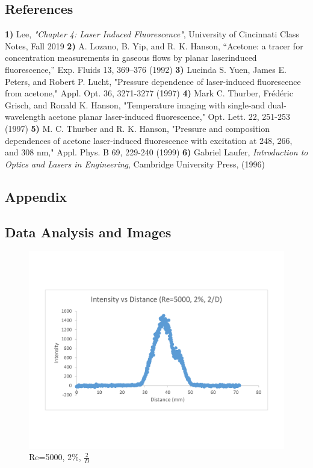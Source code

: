 \documentclass[preview,12pt]{article}
\begin{document}
\newpage
\begin{center}
    \section*{References}
\end{center}
\newline
\textbf{1)} Lee, \textit{"Chapter 4: Laser Induced Fluorescence"}, University of Cincinnati Class Notes, Fall 2019 \newline
\textbf{2)}  A. Lozano, B. Yip, and R. K. Hanson, “Acetone: a tracer for concentration measurements in gaseous flows by planar laserinduced fluorescence,” Exp. Fluids 13, 369–376 (1992) \newline
\textbf{3)}  Lucinda S. Yuen, James E. Peters, and Robert P. Lucht, "Pressure dependence of laser-induced fluorescence from acetone," Appl. Opt. 36, 3271-3277 (1997)\newline
\textbf{4)}  Mark C. Thurber, Frédéric Grisch, and Ronald K. Hanson, "Temperature imaging with single-and dual-wavelength acetone planar laser-induced fluorescence," Opt. Lett. 22, 251-253 (1997) \newline
\textbf{5)} M. C. Thurber and R. K. Hanson, "Pressure and composition dependences of acetone laser-induced fluorescence with excitation at 248, 266, and 308 nm," Appl. Phys. B 69, 229-240 (1999) \newline
\textbf{6)} Gabriel Laufer, \textit{Introduction to Optics and Lasers in Engineering}, Cambridge University Press, (1996) \newline
\newpage
\begin{center}
    \section*{Appendix}
    \subsection*{Data Analysis and Images}
\end{center}
\begin{figure}[h]
    \centering
    \includegraphics[width=0.55\linewidth]{RE-5000-20-cs2D.pdf}
    \caption{{\footnotesize Re=5000, 2\%, $\frac{2}{D}$ }}
\end{figure}
\end{document}
